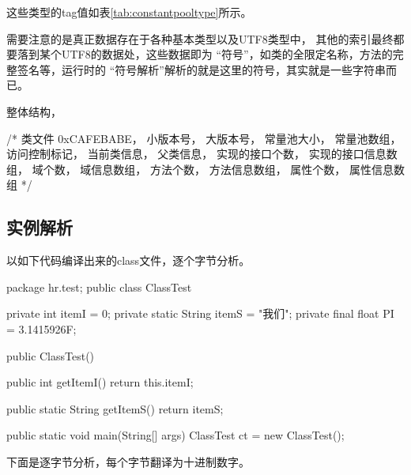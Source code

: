 这些类型的tag值如表\ref{tab:constantpooltype}所示。



需要注意的是真正数据存在于各种基本类型以及UTF8类型中，
其他的索引最终都要落到某个UTF8的数据处，这些数据即为
“符号”，如类的全限定名称，方法的完整签名等，运行时的
“符号解析”解析的就是这里的符号，其实就是一些字符串而已。

整体结构，

\begin{javacode}
/*
类文件 {
    0xCAFEBABE，
    小版本号，
    大版本号，
    常量池大小，
    常量池数组，
    访问控制标记，
    当前类信息，
    父类信息，
    实现的接口个数，
    实现的接口信息数组，
    域个数，
    域信息数组，
    方法个数，
    方法信息数组，
    属性个数，
    属性信息数组
}
*/
\end{javacode}

\subsection[实例解析]{实例解析}
以如下代码编译出来的class文件，逐个字节分析。

\begin{javacode}
package hr.test;
public class ClassTest {
  private int itemI = 0;
  private static String itemS = "我们";
  private final float PI = 3.1415926F;

  public ClassTest() { }

  public int getItemI() {
    return this.itemI;
  }

  public static String getItemS() {
    return itemS;
  }

  public static void main(String[] args) {
    ClassTest ct = new ClassTest();
  }
}
\end{javacode}

下面是逐字节分析，每个字节翻译为十进制数字。

%

